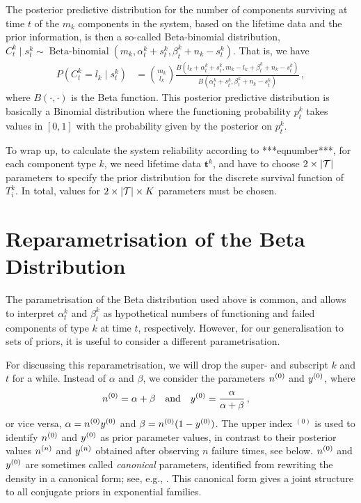 \documentclass[authoryear, 12pt, a4paper]{elsarticle}
\newcommand{\bs}[1]{\boldsymbol{#1}}
\renewcommand{\vec}[1]{{\bs#1}}
\newcommand{\uz}{^{(0)}} %
\newcommand{\bebin}{\operatorname{Beta-binomial}}
\begin{document}
The posterior predictive distribution for the number of components surviving at time $t$
of the $m_k$ components in the system, based on the lifetime data and the prior information,
is then a so-called Beta-binomial distribution,
$C^k_t \mid s^k_t \sim \bebin(m_k, \alpha^k_t + s^k_t, \beta^k_t + n_k - s^k_t)$.
That is, we have
\begin{align*}
P(C^k_t = l_k \mid s^k_t) &= {m_k \choose l_k} \frac{B(l_k + \alpha^k_t + s^k_t, m_k - l_k + \beta^k_t + n_k - s^k_t)}
                                                    {B(\alpha^k_t + s^k_t, \beta^k_t + n_k - s^k_t)} \,,
\end{align*}
where $B(\cdot, \cdot)$ is the Beta function.
This posterior predictive distribution is basically a Binomial distribution
where the functioning probability $p^k_t$ takes values in $[0,1]$
with the probability given by the posterior on $p^k_t$.

To wrap up, to calculate the system reliability according to ***eqnumber***,
for each component type $k$,
we need lifetime data $\vec{t}^k$,
and have to choose $2 \times |{\cal T}|$ parameters
to specify the prior distribution for the discrete survival function of $T^k_i$.
In total, values for $2 \times |{\cal T}| \times K$ parameters must be chosen.


\section{Reparametrisation of the Beta Distribution}

The parametrisation of the Beta distribution used above is common,
and allows to interpret $\alpha^k_t$ and $\beta^k_t$ as
hypothetical numbers of functioning and failed components of type $k$ at time $t$, respectively.
However, for our generalisation to sets of priors,
it is useful to consider a different parametrisation.

For discussing this reparametrisation, we will drop the super- and subscript $k$ and $t$ for a while.
Instead of $\alpha$ and $\beta$, we consider the parameters $\nz$ and $\yz$, where
\begin{align}
\nz &= \alpha + \beta &
&\text{and} &
\yz &= \frac{\alpha}{\alpha + \beta} \,,
\label{eq:reparam}
\end{align}
or vice versa, $\alpha = \nz\yz$ and $\beta = \nz(1-\yz)$.
The upper index ${}\uz$ is used to identify $\nz$ and $\yz$ as prior parameter values,
in contrast to their posterior values $n^{(n)}$ and $y^{(n)}$
obtained after observing $n$ failure times, see below.
$\nz$ and $\yz$ are sometimes called \emph{canonical} parameters,
identified from rewriting the density in a canonical form;
see, e.g., \citet[pp.~202 and 272f]{2000:bernardosmith}.
This canonical form gives a joint structure to all conjugate priors in exponential families.
\end{document}
